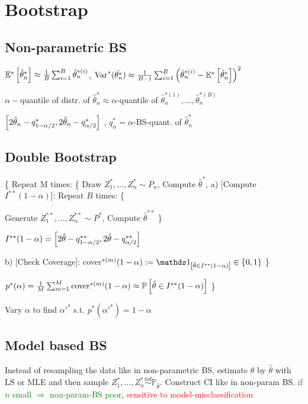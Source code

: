 \section{Bootstrap}

\vspace{-5pt}

\subsection{Non-parametric BS}

$\mathbb{E}^* \left[ \hat{\theta}_n^* \right] \approx \frac{1}{B} \sum_{i=1}^B \hat{\theta}_n^{*(i)}$, $\text{Var}^* (\hat{\theta_n^*}) \approx \frac{1}{B-1} \sum_{i=1}^B \left( \hat{\theta}_n^{*(i)} - \mathbb{E}^* \left[ \hat{\theta}_n^* \right] \right)^2$

$\alpha-$quantile of distr. of $\hat{\theta}_n^* \approx \alpha$-quantile of $\hat{\theta}_n^{*(1)},\dots,\hat{\theta}_n^{*(B)}$

\vspace{5pt}

 $\left[ 2 \hat{\theta}_n - q_{1-\alpha/2}^*, 2 \hat{\theta}_n - q_{\alpha/2}^* \right]$ , $q_{\alpha}^* = \alpha$-BS-quant. of $\hat{\theta}_n^*$

\vspace{-5pt}

\subsection{Double Bootstrap}

 \{
Repeat M times: \{
    Draw $Z_1^*,\dots,Z_n^* \sim P_n$,
    Compute $\hat{\theta}^*$,
    a) [Compute $I^{**} (1-\alpha)$]: Repeat $B$ times: \{
        
    Generate $Z_1^{**},\dots,Z_n^{**} \sim P^*$,
    Compute $\hat{\theta}^{**}$
    \}

    $I^{**} (1-\alpha) = \left[ 2 \hat{\theta} - q_{1-\alpha/2}^{**} ,  2 \hat{\theta} - q_{\alpha/2}^{**} \right]$

    b) [Check Coverage]:
    cover$^{*(m)} (1-\alpha) := \id_{\eckigeklammer{\hat{\theta} \in I^{**} (1-\alpha)}} \in \geschwungeneklammer{0,1}$
\}

$p^* (\alpha) = \frac{1}{M} \sum_{m=1}^M \text{cover}^{*(m)} (1-\alpha) \approx \mathbb{P} \left[ \hat{\theta} \in I^{**} (1-\alpha)  \right]$
\}

\vspace{2pt}

Vary $\alpha$ to find $\alpha'^*$ s.t. $p^* (\alpha'^*) = 1-\alpha$

\vspace{-5pt}

\subsection{Model based BS}
Instead of resampling the data like in non-parametric BS, estimate $\theta$ by $\hat{\theta}$ with LS or MLE and then sample $Z_1^*,\dots,Z_n^* \stackrel{iid}{\sim} \mathbb{P}_{\hat{\theta}}$. Construct CI like in non-param BS. \textcolor{green}{if $n$ small $\Rightarrow$ non-param-BS poor}, \textcolor{red}{sensitive to model-misclassification}